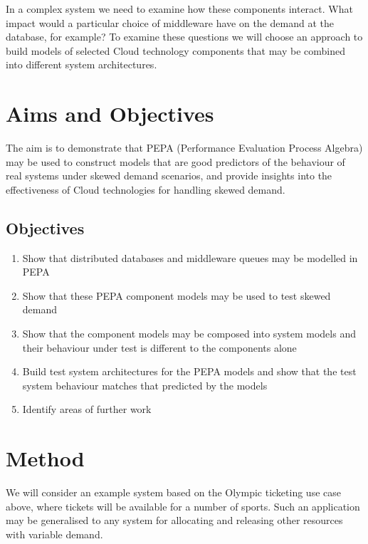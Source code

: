\documentclass[runningheads]{llncs}
\begin{document}
In a complex system we need to examine how these components interact.  What impact would a particular choice of middleware have on the demand at the database, for example?  To examine these questions we will choose an approach to build models of selected Cloud technology components that may be combined into different system architectures.

%
%

\section{Aims and Objectives}

The aim is to demonstrate that PEPA (Performance Evaluation Process Algebra) \cite{RN1051} may be used to construct models that are good predictors of the behaviour of real systems under skewed demand scenarios, and provide insights into the effectiveness of Cloud technologies for handling skewed demand.

\subsection{Objectives}
\begin{enumerate}
	\item Show that distributed databases and middleware queues may be modelled in PEPA
	\item Show that these PEPA component models may be used to test skewed demand 
	\item Show that the component models may be composed into system models and their behaviour under test is different to the components alone
	\item Build test system architectures for the PEPA models and show that the test system behaviour matches that predicted by the models
	\item Identify areas of further work
\end{enumerate}

\section{Method}

We will consider an example system based on the Olympic ticketing use case above, where tickets will be available for a number of sports.  Such an application may be generalised to any system for allocating and releasing other resources with variable demand.
\end{document}
